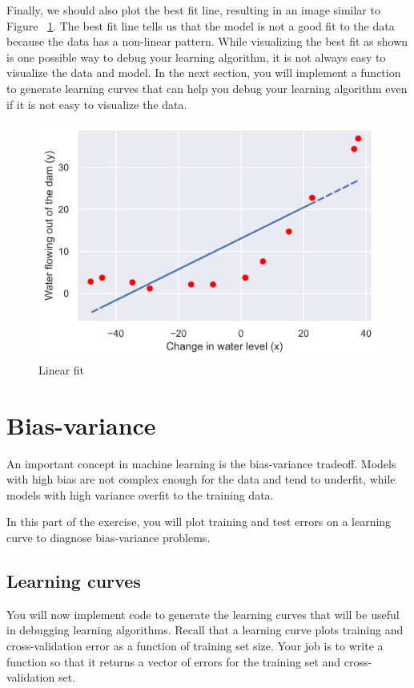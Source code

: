 \documentclass[12pt]{article}
\begin{document}
Finally, we should also plot the best fit line, resulting in an image similar to Figure ~\ref{fig:linearfit}. The best fit line tells us that the model is not a good fit to the data because the data has a non-linear pattern. While visualizing the best fit as shown is one possible way to debug your learning algorithm, it is not always easy to visualize the data and model. In the next section, you will implement a function to generate learning curves that can help you debug your learning algorithm even if it is not easy to visualize the data.

\begin{figure}[h!]
  \centering
  \includegraphics[scale=0.6]{linearfit.png}
  \caption{Linear fit}
  \label{fig:linearfit}
\end{figure}

\section{Bias-variance}

An important concept in machine learning is the bias-variance tradeoff. Models with high bias are not complex enough for the data and tend to underfit, while models with high variance overfit to the training data.

In this part of the exercise, you will plot training and test errors on a learning curve to diagnose bias-variance problems.

\subsection{Learning curves}

You will now implement code to generate the learning curves that will be useful in debugging learning algorithms. Recall that a learning curve plots training and cross-validation error as a function of training set size. Your job is to write a function so that it returns a vector of errors for the training set and cross-validation set.
\end{document}
